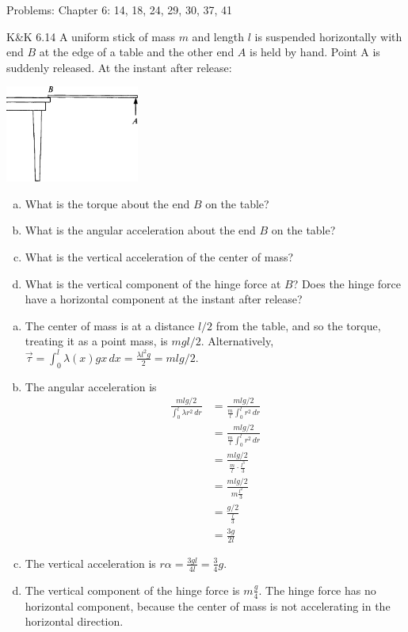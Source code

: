 \documentclass{esg8012pset}
\renewcommand{\d}{\,d}
\begin{document}
\noindent Problems: Chapter 6: 14, 18, 24, 29, 30, 37, 41



\begin{problem}{K\&K 6.14}
  A uniform stick of mass $m$ and length $l$ is suspended horizontally with end $B$ at the edge of a table and the other end $A$ is held by hand. Point A is suddenly released. At the instant after release:
  \begin{center}\includegraphics[width=0.33\textwidth]{ps09_1}\end{center}
  \begin{enumerate}[(a)]
    \item What is the torque about the end $B$ on the table?
    \item What is the angular acceleration about the end $B$ on the table?
    \item What is the vertical acceleration of the center of mass?
    \item What is the vertical component of the hinge force at $B$? Does the hinge force have a horizontal component at the instant after release?
  \end{enumerate}
\end{problem}
\begin{solution}
  \begin{enumerate}[(a)]
    \item The center of mass is at a distance $l / 2$ from the table, and so the torque, treating it as a point mass, is $m g l / 2$.  Alternatively, $\vec \tau = \int_0^l \lambda(x) g x \d x = \frac{\lambda l^2 g}{2} = m l g / 2$.
    \item The angular acceleration is \begin{align*}
      \frac{m l g / 2}{\int_0^l \lambda r^2 \d r} & = \frac{m l g / 2}{\frac{m}{l} \int_0^l r^2 \d r } \\
      & = \frac{m l g / 2}{\frac{m}{l} \int_0^l r^2 \d r } \\
      & = \frac{m l g / 2}{\frac{m}{l} \cdot \frac{l^3}{3} } \\
      & = \frac{m l g / 2}{m \frac{l^2}{3} } \\
      & = \frac{g / 2}{\frac{l}{3} } \\
      & = \frac{3 g}{2 l}
      \end{align*}
    \item The vertical acceleration is $r\alpha = \frac{3 g l}{4 l} = \frac{3}{4}g$.
    \item The vertical component of the hinge force is $m\frac{g}{4}$.  The hinge force has no horizontal component, because the center of mass is not accelerating in the horizontal direction.
  \end{enumerate}
\end{solution}
\end{document}
